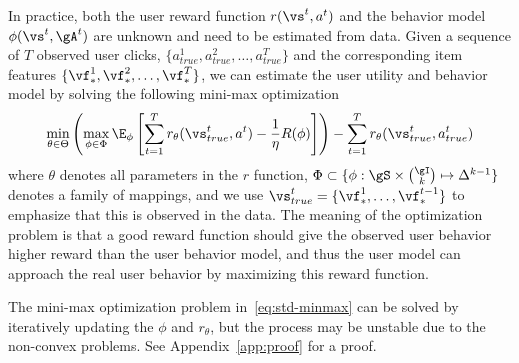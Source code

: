 \documentclass{article} %
\newcommand{\xc}[1]{{\color{blue}{\bf\sf [#1]}}}
\newcommand{\xinshi}[1]{{\color{black}{#1}}}
\begin{document}
In practice, both the user reward function $r(\vs^t,a^t)$ and the behavior model $\phi(\vs^t, \gA^t)$ are unknown and need to be estimated from data. Given a sequence of $T$ observed user clicks, $\{a^1_{true},a^2_{true},\ldots,a^T_{true}\}$ and the corresponding item features $\{\vf_\ast^1, \vf_\ast^2, \ldots, \vf_\ast^T\}$, we can estimate the user utility and behavior model by solving the following mini-max optimization
{\small \begin{equation}\label{eq:std-minmax}
	\min_{\theta \in \Theta} \left(\max_{\phi\in \Phi}  \E_{\phi} \left[\sum_{t=1}^Tr_{\theta}(\vs^t_{true}, a^t) -\frac{1}{\eta}R(\phi)\right]\right)-\sum_{t=1}^T r_{\theta}(\vs^t_{true}, a^t_{true})
\end{equation}}
where $\theta$ denotes all parameters in the $r$ function, $\Phi \subset \{\phi:\gS \times {\gI \choose k} \mapsto \Delta^{k-1}\}$ denotes a family of mappings, and we use $\vs^t_{true}=\{\vf_\ast^1,\ldots,\vf_\ast^{t-1}\}$ to emphasize that this is observed in the data.
The meaning of the optimization problem is that
a good reward function should give the observed user behavior higher reward than the user behavior model, and thus the user model can approach the real user behavior by maximizing this reward function.

The mini-max optimization problem in~\eqref{eq:std-minmax} can be  solved by iteratively updating the $\phi$ and $r_{\theta}$, but the process may be unstable due to the non-convex problems.
\xinshi{We will explain how we can make use of a special closed form to help initialize the mini-max optimization after the statement of the following lemma.} See Appendix~\ref{app:proof} for a proof.

\end{document}
